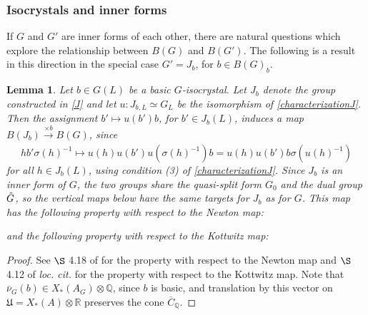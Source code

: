 \documentclass[11pt,a4paper]{article}
\theoremstyle{definition}
\theoremstyle{plain}
\newtheorem{Le}[shared]{Lemma}
\theoremstyle{remark}
\theoremstyle{plain}
\begin{document}
\subsubsection{Isocrystals and inner forms}
If $G$ and $G'$ are inner forms of each other, there are natural questions which explore the relationship between $B(G)$ and $B(G')$. The following is a result in this direction in the special case $G' = J_b$, for $b \in B(G)_b$.

\begin{Le}\label{isocrystalsandinnerforms}
    Let $b \in G(L)$ be a basic $G$-isocrystal. Let $J_b$ denote the group constructed in \ref{J} and let $u: J_{b,L} \simeq G_L$ be the isomorphism of \ref{characterizationJ}. Then the assignment $b' \mapsto u(b')b$, for $b' \in J_b(L)$, induces a map $B(J_b) \xrightarrow[]{\times b} B(G)$, since $$h b' \sigma(h)^{-1} \mapsto u(h) u(b')u(\sigma(h)^{-1})b = u(h)u(b')b\sigma(u(h)^{-1})$$ for all $h \in J_b(L)$, using condition (3) of \ref{characterizationJ}. Since $J_b$ is an inner form of $G$, the two groups share the quasi-split form $G_0$ and the dual group $\Hat{G}$, so the vertical maps below have the same targets for $J_b$ as for $G$. This map has the following property with respect to the Newton map:
    \begin{center}
    \end{center}
    and the following property with respect to the Kottwitz map:
    \begin{center}
    \end{center}
\end{Le}
\begin{proof}
    See $\S$ 4.18 of \cite{MR1485921} for the property with respect to the Newton map and $\S$ 4.12 of \textit{loc. cit.} for the property with respect to the Kottwitz map. Note that $\overline{\nu}_G(b) \in X_*(A_G) \otimes \mathbb{Q}$, since $b$ is basic, and translation by this vector on $\mathfrak{U} = X_*(A)\otimes \mathbb{R}$ preserves the cone $\overline{C}_\mathbb{Q}$.
\end{proof}
\end{document}
